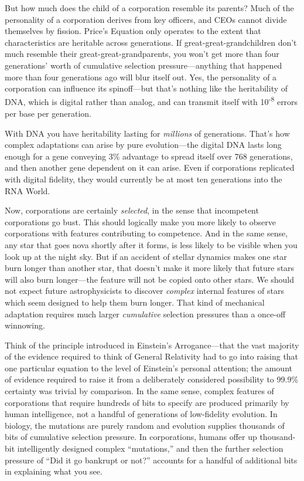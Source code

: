 {
 But how much does the child of a corporation resemble its parents?
Much of the personality of a corporation derives from key officers, and
CEOs cannot divide themselves by fission. Price's
Equation only operates to the extent that characteristics are heritable
across generations. If great-great-grandchildren don't
much resemble their great-great-grandparents, you won't
get more than four generations' worth of cumulative
selection pressure---anything that happened more than four generations
ago will blur itself out. Yes, the personality of a corporation can
influence its spinoff---but that's nothing like the
heritability of DNA, which is digital rather than analog, and can
transmit itself with 10\textsuperscript{{}-8} errors per base per
generation.}

{
 With DNA you have heritability lasting for \textit{millions} of
generations. That's how complex adaptations can arise
by pure evolution---the digital DNA lasts long enough for a gene
conveying 3\% advantage to spread itself over 768 generations, and then
another gene dependent on it can arise. Even if corporations replicated
with digital fidelity, they would currently be at most ten generations
into the RNA World.}

{
 Now, corporations are certainly \textit{selected}, in the sense
that incompetent corporations go bust. This should logically make you
more likely to observe corporations with features contributing to
competence. And in the same sense, any star that goes nova shortly
after it forms, is less likely to be visible when you look up at the
night sky. But if an accident of stellar dynamics makes one star burn
longer than another star, that doesn't make it more
likely that future stars will also burn longer---the feature will not
be copied onto other stars. We should not expect future astrophysicists
to discover \textit{complex} internal features of stars which seem
designed to help them burn longer. That kind of mechanical adaptation
requires much larger \textit{cumulative} selection pressures than a
once-off winnowing.}

{
 Think of the principle introduced in Einstein's
Arrogance---that the vast majority of the evidence required to think of
General Relativity had to go into raising that one particular equation
to the level of Einstein's personal attention; the
amount of evidence required to raise it from a deliberately considered
possibility to 99.9\% certainty was trivial by comparison. In the same
sense, complex features of corporations that require hundreds of bits
to specify are produced primarily by human intelligence, not a handful
of generations of low-fidelity evolution. In biology, the mutations are
purely random and evolution supplies thousands of bits of cumulative
selection pressure. In corporations, humans offer up thousand-bit
intelligently designed complex
``mutations,'' and then the further
selection pressure of ``Did it go bankrupt or
not?'' accounts for a handful of additional bits in
explaining what you see.}

